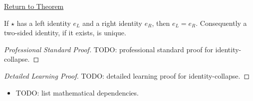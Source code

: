 \newpage
{}
\label{prf:identity-collapse}

\begin{remark*}[Return]
\hyperref[prop:identity-collapse]{Return to Theorem}
\end{remark*}

\begin{proposition*}
If $\star$ has a left identity $e_L$ and a right identity $e_R$, then
$e_L=e_R$. Consequently a two-sided identity, if it exists, is unique.
\end{proposition*}

\begin{proof}[Professional Standard Proof]
\LRAProofBodyStart
TODO: professional standard proof for identity-collapse.
\end{proof}

\begin{proof}[Detailed Learning Proof]
\LRAProofBodyStart
TODO: detailed learning proof for identity-collapse.
\end{proof}

\begin{remark*}
\end{remark*}

\begin{dependencies}
\begin{itemize}
  \item TODO: list mathematical dependencies.
\end{itemize}
\end{dependencies}

\clearpage
